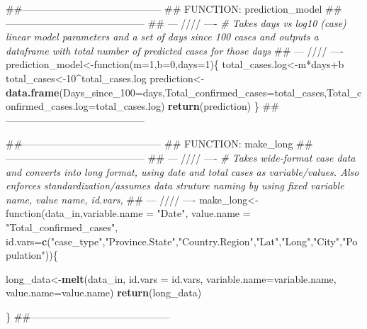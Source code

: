 \documentclass[]{article}
\newenvironment{Shaded}{\begin{snugshade}}{\end{snugshade}}
\newcommand{\KeywordTok}[1]{\textcolor[rgb]{0.13,0.29,0.53}{\textbf{{#1}}}}
\newcommand{\DataTypeTok}[1]{\textcolor[rgb]{0.13,0.29,0.53}{{#1}}}
\newcommand{\DecValTok}[1]{\textcolor[rgb]{0.00,0.00,0.81}{{#1}}}
\newcommand{\StringTok}[1]{\textcolor[rgb]{0.31,0.60,0.02}{{#1}}}
\newcommand{\CommentTok}[1]{\textcolor[rgb]{0.56,0.35,0.01}{\textit{{#1}}}}
\newcommand{\NormalTok}[1]{{#1}}
\begin{document}
\begin{Shaded}
\begin{Highlighting}[]
\NormalTok{##------------------------------------------}
\NormalTok{## FUNCTION: prediction_model}
\NormalTok{##------------------------------------------}
\NormalTok{## --- //// ----}
\CommentTok{# Takes days vs log10 (case) linear model parameters and a set of days since 100 cases and outputs a dataframe with total number of predicted cases for those days}
\NormalTok{## --- //// ----}
\NormalTok{prediction_model<-function(}\DataTypeTok{m=}\DecValTok{1}\NormalTok{,}\DataTypeTok{b=}\DecValTok{0}\NormalTok{,}\DataTypeTok{days=}\DecValTok{1}\NormalTok{)\{}
  \NormalTok{total_cases.log<-m*days+b}
  \NormalTok{total_cases<-}\DecValTok{10}\NormalTok{^total_cases.log}
  \NormalTok{prediction<-}\KeywordTok{data.frame}\NormalTok{(}\DataTypeTok{Days_since_100=}\NormalTok{days,}\DataTypeTok{Total_confirmed_cases=}\NormalTok{total_cases,}\DataTypeTok{Total_confirmed_cases.log=}\NormalTok{total_cases.log)}
  \KeywordTok{return}\NormalTok{(prediction)}
\NormalTok{\}}
\NormalTok{##------------------------------------------}

\NormalTok{##------------------------------------------}
\NormalTok{## FUNCTION: make_long}
\NormalTok{##------------------------------------------}
\NormalTok{## --- //// ----}
\CommentTok{# Takes wide-format case data and converts into long format, using date and total cases as variable/values. Also enforces standardization/assumes data struture naming by using fixed variable name, value name, id.vars, }
\NormalTok{## --- //// ----}
\NormalTok{make_long<-function(data_in,}\DataTypeTok{variable.name =} \StringTok{"Date"}\NormalTok{,}
                   \DataTypeTok{value.name =} \StringTok{"Total_confirmed_cases"}\NormalTok{,}
                   \DataTypeTok{id.vars=}\KeywordTok{c}\NormalTok{(}\StringTok{"case_type"}\NormalTok{,}\StringTok{"Province.State"}\NormalTok{,}\StringTok{"Country.Region"}\NormalTok{,}\StringTok{"Lat"}\NormalTok{,}\StringTok{"Long"}\NormalTok{,}\StringTok{"City"}\NormalTok{,}\StringTok{"Population"}\NormalTok{))\{}

\NormalTok{long_data<-}\KeywordTok{melt}\NormalTok{(data_in,}
                \DataTypeTok{id.vars =} \NormalTok{id.vars,}
                \DataTypeTok{variable.name=}\NormalTok{variable.name,}
                \DataTypeTok{value.name=}\NormalTok{value.name)}
\KeywordTok{return}\NormalTok{(long_data)}
  
\NormalTok{\}}
\NormalTok{##------------------------------------------}


\end{Highlighting}
\end{Shaded}
\end{document}
